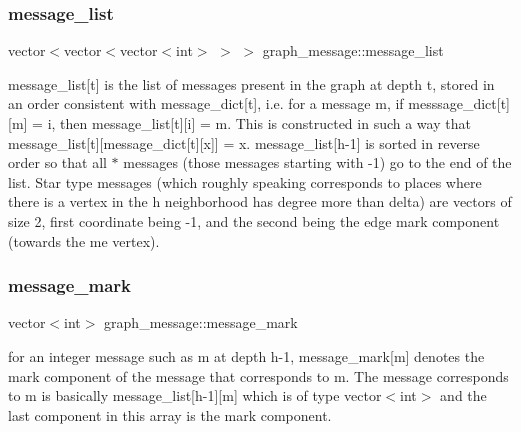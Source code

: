 \mbox{\label{classgraph__message_aa17fdb629b423343edfafa97252763ef}} 
\subsubsection{\texorpdfstring{message\+\_\+list}{message\_list}}
{\footnotesize\ttfamily vector$<$vector$<$vector$<$int$>$ $>$ $>$ graph\+\_\+message\+::message\+\_\+list}



message\+\_\+list\mbox{[}t\mbox{]} is the list of messages present in the graph at depth t, stored in an order consistent with message\+\_\+dict\mbox{[}t\mbox{]}, i.\+e. for a message m, if messsage\+\_\+dict\mbox{[}t\mbox{]}\mbox{[}m\mbox{]} = i, then message\+\_\+list\mbox{[}t\mbox{]}\mbox{[}i\mbox{]} = m. This is constructed in such a way that message\+\_\+list\mbox{[}t\mbox{]}\mbox{[}message\+\_\+dict\mbox{[}t\mbox{]}\mbox{[}x\mbox{]}\mbox{]} = x. message\+\_\+list\mbox{[}h-\/1\mbox{]} is sorted in reverse order so that all $\ast$ messages (those messages starting with -\/1) go to the end of the list. Star type messages (which roughly speaking corresponds to places where there is a vertex in the h neighborhood has degree more than delta) are vectors of size 2, first coordinate being -\/1, and the second being the edge mark component (towards the \textquotesingle{}me\textquotesingle{} vertex). 

\mbox{\label{classgraph__message_a49d9af5150daf0599c29fe18cb032fa5}} 
\subsubsection{\texorpdfstring{message\+\_\+mark}{message\_mark}}
{\footnotesize\ttfamily vector$<$int$>$ graph\+\_\+message\+::message\+\_\+mark}



for an integer message such as m at depth h-\/1, message\+\_\+mark\mbox{[}m\mbox{]} denotes the mark component of the message that corresponds to m. The message corresponds to m is basically message\+\_\+list\mbox{[}h-\/1\mbox{]}\mbox{[}m\mbox{]} which is of type vector$<$int$>$ and the last component in this array is the mark component. 

